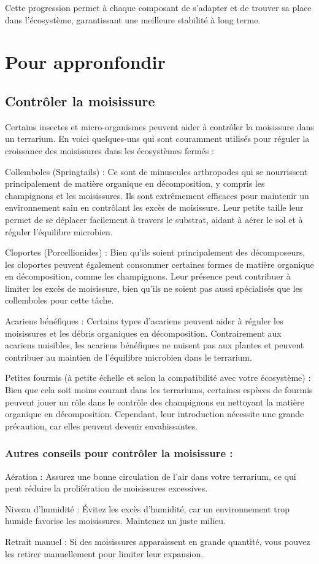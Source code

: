 Cette progression permet à chaque composant de s'adapter et de trouver sa place dans l'écosystème, garantissant une meilleure stabilité à long terme.

\newpage

\section{Pour appronfondir}

\subsection{Contrôler la moisissure}
Certains insectes et micro-organismes peuvent aider à contrôler la moisissure dans un terrarium. En voici quelques-uns qui sont couramment utilisés pour réguler la croissance des moisissures dans les écosystèmes fermés :
\ben
    \item Collemboles (Springtails) :  Ce sont de minuscules arthropodes qui se nourrissent principalement de matière organique en décomposition, y compris les champignons et les moisissures. Ils sont extrêmement efficaces pour maintenir un environnement sain en contrôlant les excès de moisissure. Leur petite taille leur permet de se déplacer facilement à travers le substrat, aidant à aérer le sol et à réguler l'équilibre microbien.
    \item Cloportes (Porcellionides) : Bien qu'ils soient principalement des décomposeurs, les cloportes peuvent également consommer certaines formes de matière organique en décomposition, comme les champignons. Leur présence peut contribuer à limiter les excès de moisissure, bien qu'ils ne soient pas aussi spécialisés que les collemboles pour cette tâche.
    \item Acariens bénéfiques : Certains types d'acariens peuvent aider à réguler les moisissures et les débris organiques en décomposition. Contrairement aux acariens nuisibles, les acariens bénéfiques ne nuisent pas aux plantes et peuvent contribuer au maintien de l'équilibre microbien dans le terrarium.
    \item Petites fourmis (à petite échelle et selon la compatibilité avec votre écosystème) : Bien que cela soit moins courant dans les terrariums, certaines espèces de fourmis peuvent jouer un rôle dans le contrôle des champignons en nettoyant la matière organique en décomposition. Cependant, leur introduction nécessite une grande précaution, car elles peuvent devenir envahissantes.
\een
\subsubsection{Autres conseils pour contrôler la moisissure :}
\ben
    \item Aération : Assurez une bonne circulation de l'air dans votre terrarium, ce qui peut réduire la prolifération de moisissures excessives.
    \item Niveau d'humidité : Évitez les excès d'humidité, car un environnement trop humide favorise les moisissures. Maintenez un juste milieu.
    \item Retrait manuel : Si des moisissures apparaissent en grande quantité, vous pouvez les retirer manuellement pour limiter leur expansion.
\een

